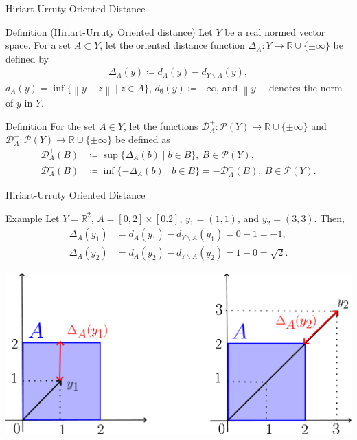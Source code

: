 \documentclass[aspectratio=169, dvipdfmx, 11pt]{beamer}
\newcommand{\RealNumberSet}{\mathbb{R}}
\newcommand{\Norm}[1]{\left\lVert {#1} \right\rVert} %
\begin{document}
\begin{frame}{Hiriart-Urruty Oriented Distance}
  \begin{block}{Definition (Hiriart-Urruty Oriented distance) \cite{xu2016new}}
    Let $Y$ be a real normed vector space. For a set $A \subset Y$, let the oriented distance function
    $\Delta_{A} \colon Y \to \RealNumberSet\cup\{\pm \infty\}$ be defined by
    \begin{align*}
      \Delta_{A}(y) \coloneq d_{A} (y) - d_{Y \backslash A}(y),
    \end{align*}
    $ d_{A} (y)= \inf\{\Norm{y - z} \mid z \in A\}$, $d_{\emptyset} (y) \coloneq + \infty$,
    and $\Norm{y}$ denotes the norm of $y$ in $Y$.
  \end{block}

  \begin{block}{Definition \cite{xu2016new}}
    For the set $A \in Y$, let the functions $\mathcal{D}^{+}_{A} \colon \mathcal{P}(Y) \to \RealNumberSet \cup \{\pm \infty\}$
    and $\mathcal{D}^{-}_{A} \colon \mathcal{P}(Y) \to \RealNumberSet \cup \{\pm \infty\}$ be defined as
    \begin{align*}
      \mathcal{D}^{+}_{A}(B) & \coloneq \sup\{\Delta_{A}(b) \mid b \in B\},\: B \in \mathcal{P}(Y),                            \\
      \mathcal{D}^{-}_{A}(B) & \coloneq \inf\{-\Delta_{A}(b) \mid b \in B\} = -\mathcal{D}^{+}_{A}(B),\: B \in \mathcal{P}(Y).
    \end{align*}
  \end{block}
\end{frame}

\begin{frame}{Hiriart-Urruty Oriented Distance}
  \begin{exampleblock}{Example}
    Let $Y = \RealNumberSet^{2}$, $A = [0,2] \times [0.2]$, $y_{1} = (1,1)$, and $y_{2} = (3, 3)$. Then,
    \begin{align*}
      \Delta_{A}(y_{1}) & = d_{A}(y_{1}) - d_{Y \backslash A}(y_{1}) = 0 - 1 = -1,        \\
      \Delta_{A}(y_{2}) & = d_{A}(y_{2}) - d_{Y \backslash A}(y_{2}) = 1 - 0 = \sqrt{2} .
    \end{align*}
  \end{exampleblock}
  \centering
  \includegraphics[keepaspectratio, scale=0.10]{figures/eps/hiriart-urruty_distance_example.eps}
\end{frame}
\end{document}
